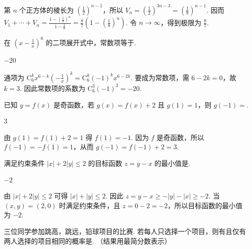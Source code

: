 \begin{solution}
第 \(n\) 个正方体的棱长为 \(\left(\frac{1}{2}\right)^{n-1}\)，所以 \(V_n=\left(\frac{1}{2}\right)^{3n-3}=\left(\frac{1}{8}\right)^{n-1}\). 因而 \(V_1+\cdots+V_n=\frac{1-\left(\frac{1}{8}\right)^n}{1-\frac{1}{8}}=\frac{8}{7}\left(1-\left(\frac{1}{8}\right)^n\right)\). 令 \(n\to\infty\)，得到极限为 \(\frac{8}{7}\).
\end{solution}

\begin{problem}
在 \(\left(x - \frac{1}{x}\right)^{6}\) 的二项展开式中，常数项等于\fillinblank{}.
\end{problem}

\begin{answer}
\(-20\)
\end{answer}

\begin{solution}
通项为 \(\mathrm C_6^k x^{6-k}\left(-\frac{1}{x}\right)^k=\mathrm C_6^k(-1)^k x^{6-2k}\). 要成为常数项，需 \(6-2k=0\)，故 \(k=3\). 因此常数项的系数为 \(\mathrm C_6^3(-1)^3=-20\).
\end{solution}

\begin{problem}
已知 \( y = f(x) \) 是奇函数，若 \( g(x) = f(x) + 2 \) 且 \( g(1) = 1 \)，则 \( g(-1) = \)\fillinblank{}.
\end{problem}

\begin{answer}
\(3\)
\end{answer}

\begin{solution}
由 \(g(1)=f(1)+2=1\) 得 \(f(1)=-1\). 因为 \(f\) 是奇函数，所以 \(f(-1)=-f(1)=1\)，从而 \(g(-1)=f(-1)+2=3\).
\end{solution}

\begin{problem}
满足约束条件 \( |x| + 2|y| \leqslant 2 \) 的目标函数 \( z = y - x \) 的最小值是\fillinblank{}.
\end{problem}

\begin{answer}
\(-2\)
\end{answer}

\begin{solution}
由 \(|x|+2|y|\leqslant2\) 可得 \(|x|+|y|\leqslant2\). 因此 \(z=y-x\geqslant-|y|-|x|\geqslant-2\). 当 \((x,y)=(2,0)\) 时满足约束条件，且 \(z=0-2=-2\)，所以目标函数的最小值为 \(-2\).
\end{solution}

\begin{problem}
三位同学参加跳高，跳远，铅球项目的比赛. 若每人只选择一个项目，则有且仅有两人选择的项目相同的概率是\fillinblank{}. （结果用最简分数表示）
\end{problem}


